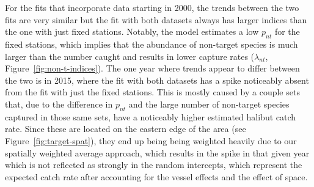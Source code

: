 \documentclass[12pt]{article}\usepackage[]{graphicx}\usepackage[]{color}
\begin{document}
For the fits that incorporate data starting in 2000, the trends between the two fits are very similar but the fit with both datasets always has larger indices than the one with just fixed stations. Notably, the model estimates a low \(p_{nt}\) for the fixed stations, which implies that the abundance of non-target species is much larger than the number caught and results in lower capture rates (\(\lambda_{nt}\), Figure~\ref{fig:non-t-indices}). The one year where trends appear to differ between the two is in 2015, where the fit with both datasets has a spike noticeably absent from the fit with just the fixed stations. This is mostly caused by a couple sets that, due to the difference in \(p_{nt}\) and the large number of non-target species captured in those same sets, have a noticeably higher estimated halibut catch rate. Since these are located on the eastern edge of the area (see Figure~\ref{fig:target-spat}), they end up being being weighted heavily due to our spatially weighted average approach, which results in the spike in that given year which is not reflected as strongly in the random intercepts, which represent the expected catch rate after accounting for the vessel effects and the effect of space.
\end{document}
